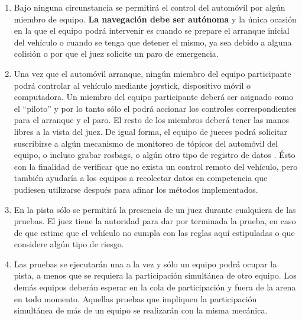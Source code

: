 \documentclass[letterpaper,12pt]{article}
\begin{document}
\begin{enumerate}
\item Bajo ninguna circunstancia se permitirá el control del automóvil por algún miembro de equipo. \textbf{La navegación debe ser autónoma} y la única ocasión en la que el equipo podrá intervenir es cuando se prepare el arranque inicial del vehículo o cuando se tenga que detener el mismo, ya sea debido a alguna colisión o por que el juez solicite un paro de emergencia.


\item Una vez que el automóvil arranque, ningún miembro del equipo participante podrá controlar al vehículo mediante joystick, dispositivo móvil o computadora. Un miembro del equipo participante deberá ser asignado como el ``piloto'' y por lo tanto sólo el podrá accionar los controles correspondientes para el arranque y el paro. El resto de los miembros deberá tener las manos libres a la vista del juez. De igual forma, el equipo de jueces podrá solicitar suscribirse a algún mecanismo de monitoreo de tópicos del automóvil del equipo, o incluso grabar rosbags, o algún otro tipo de registro de datos . Ésto con la finalidad de verificar que no exista un control remoto del vehículo, pero también ayudaría a los equipos a recolectar datos en competencia que pudiesen utilizarse después para afinar los métodos implementados.

\item En la pista sólo se permitirá la presencia de un juez durante cualquiera de las pruebas. El juez tiene la autoridad para dar por terminada la prueba, en caso de que estime que el vehículo no cumpla con las reglas aquí estipuladas o que considere algún tipo de riesgo.

\item Las pruebas se ejecutarán una a la vez y sólo un equipo podrá ocupar la pista, a menos que se requiera la participación simultánea de otro equipo. Los demás equipos deberán esperar en la cola de participación y fuera de la arena en todo momento. Aquellas pruebas que impliquen la participación simultánea de más de un equipo se realizarán con la misma mecánica.


\end{enumerate}
\end{document}
